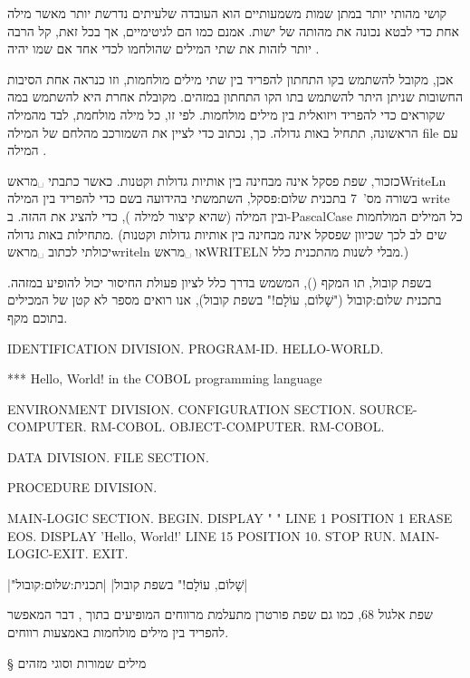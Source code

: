 קושי מהותי יותר במתן שמות משמעותיים
הוא העובדה שלעיתים נדרשת יותר מאשר מילה אחת
כדי לבטא נכונה את מהותה של ישות. אמנם  כמו 
הם לגיטימיים, אך בכל זאת, קל הרבה יותר לזהות את שתי המילים שהולחמו לכדי 
אחד אם שמו יהיה .

אכן, מקובל להשתמש בקו התחתון להפריד בין שתי מילים מולחמות, וזו כנראה אחת
הסיבות החשובות שניתן היתר להשתמש בתו הקו התחתון במזהים.  מקובלת אחרת
היא להשתמש במה שקוראים  כדי להפריד ויזואלית בין מילים מולחמות.
לפי  זו, כל מילה מולחמת, לבד מהמילה הראשונה, תתחיל באות גדולה. כך,
נכתוב  כדי לציין את ה שמורכב מהלחם של המילה {file} עם המילה
.

כזכור, שפת פסקל אינה מבחינה בין אותיות גדולות וקטנות. כאשר כתבתי
␣מראש{WriteLn} בשורה מס'~7 ב תכנית שלום:פסקל, השתמשתי ב הידועה
בשם  כדי להפריד בין המילה {write} ובין המילה  (שהיא
קיצור למילה ), כדי להציג את ה הזה. ב-{PascalCase} כל המילים
המולחמות מתחילות באות גדולה. (שים לב לכך שכיוון שפסקל אינה מבחינה בין אותיות
גדולות וקטנות יכולתי לכתוב ␣מראש{writeln} או ␣מראש{WRITELN} מבלי
לשנות מהתכנית כלל.)

בשפת קובול, תו המקף (), המשמש בדרך כלל לציון פעולת החיסור יכול להופיע
במזהה. ב תכנית שלום:קובול ("שָׁלוֹם, עוֹלָם!" בשפת קובול), אנו רואים מספר לא קטן
של  המכילים בתוכם מקף.

\begin{תכנית}
\setLTR
\lstset{comment=[f][commentstyle][1]*}
\begin{COBOL}
IDENTIFICATION DIVISION.
PROGRAM-ID. HELLO-WORLD.

*** Hello, World! in the COBOL programming language

ENVIRONMENT DIVISION.
CONFIGURATION SECTION.
SOURCE-COMPUTER. RM-COBOL.
OBJECT-COMPUTER. RM-COBOL.

DATA DIVISION.
FILE SECTION.

PROCEDURE DIVISION.

MAIN-LOGIC SECTION.
BEGIN.
DISPLAY " " LINE 1 POSITION 1 ERASE EOS.
DISPLAY 'Hello, World!' LINE 15 POSITION 10.
STOP RUN.
MAIN-LOGIC-EXIT.
EXIT.
\end{COBOL}
|"שָׁלוֹם, עוֹלָם!" בשפת קובול|
|תכנית:שלום:קובול|
\end{תכנית}

שפת אלגול 68, כמו גם שפת פורטרן מתעלמת מרווחים המופיעים בתוך , דבר המאפשר
להפריד בין מילים מולחמות באמצעות רווחים.

§ מילים שמורות וסוגי מזהים

